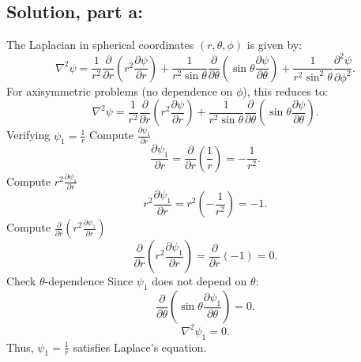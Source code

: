 \documentclass[12pt]{article}
\begin{document}
    \subsection*{Solution, part a:}
        The Laplacian in spherical coordinates \((r, \theta, \phi)\) is given by:
        \[
        \nabla^2 \psi = \frac{1}{r^2} \frac{\partial}{\partial r} \left( r^2 \frac{\partial \psi}{\partial r} \right) + \frac{1}{r^2 \sin \theta} \frac{\partial}{\partial \theta} \left( \sin \theta \frac{\partial \psi}{\partial \theta} \right) + \frac{1}{r^2 \sin^2 \theta} \frac{\partial^2 \psi}{\partial \phi^2}.
        \]
        For axisymmetric problems (no dependence on \(\phi\)), this reduces to:
        \[
        \nabla^2 \psi = \frac{1}{r^2} \frac{\partial}{\partial r} \left( r^2 \frac{\partial \psi}{\partial r} \right) + \frac{1}{r^2 \sin \theta} \frac{\partial}{\partial \theta} \left( \sin \theta \frac{\partial \psi}{\partial \theta} \right).
        \]
        Verifying \( \psi_1 = \frac{1}{r} \)
        Compute \( \frac{\partial \psi_1}{\partial r} \)
        \[
        \frac{\partial \psi_1}{\partial r} = \frac{\partial}{\partial r} \left( \frac{1}{r} \right) = -\frac{1}{r^2}.
        \]
        Compute \( r^2 \frac{\partial \psi_1}{\partial r} \)
        \[
        r^2 \frac{\partial \psi_1}{\partial r} = r^2 \left( -\frac{1}{r^2} \right) = -1.
        \]
        Compute \( \frac{\partial}{\partial r} \left( r^2 \frac{\partial \psi_1}{\partial r} \right) \)
        \[
        \frac{\partial}{\partial r} \left( r^2 \frac{\partial \psi_1}{\partial r} \right) = \frac{\partial}{\partial r} \left( -1 \right) = 0.
        \]
        Check \(\theta\)-dependence
        Since \( \psi_1 \) does not depend on \(\theta\):
        \[
        \frac{\partial}{\partial \theta} \left( \sin \theta \frac{\partial \psi_1}{\partial \theta} \right) = 0.
        \]
        \[
        \nabla^2 \psi_1 = 0.
        \]
        Thus, \( \psi_1 = \frac{1}{r} \) satisfies Laplace’s equation.
    
\end{document}
